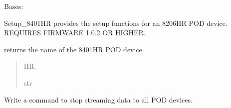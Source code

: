 \documentclass[letterpaper,10pt,english]{sphinxmanual}
\begin{document}
\begin{fulllineitems}
\label{\detokenize{Setup_8401HR:Setup_8401HR.Setup_8401HR}}
\pysigstartsignatures
{}
\pysigstopsignatures
\sphinxAtStartPar
Bases: {\hyperref[\detokenize{Setup_PodInterface:Setup_PodInterface.Setup_Interface}]{}}

\sphinxAtStartPar
Setup\_8401HR provides the setup functions for an 8206\sphinxhyphen{}HR POD device.     REQUIRES FIRMWARE 1.0.2 OR HIGHER.

\begin{fulllineitems}
\label{\detokenize{Setup_8401HR:Setup_8401HR.Setup_8401HR.GetDeviceName}}
\pysigstartsignatures
{}
\pysigstopsignatures
\sphinxAtStartPar
returns the name of the 8401\sphinxhyphen{}HR POD device.
\begin{quote}\begin{description}
\sphinxhyphen{}HR.

\sphinxAtStartPar
str

\end{description}\end{quote}

\end{fulllineitems}


\begin{fulllineitems}
\label{\detokenize{Setup_8401HR:Setup_8401HR.Setup_8401HR.StopStream}}
\pysigstartsignatures
{}
\pysigstopsignatures
\sphinxAtStartPar
Write a command to stop streaming data to all POD devices.

\end{fulllineitems}



\end{fulllineitems}
\end{document}
